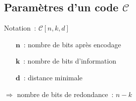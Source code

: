 \documentclass[a4paper,10pt]{leaflet}
\newcommand{\code}[1]{\mathcal{#1}}
\newcommand{\C}{\code{C}}
\begin{document}
\subsection{Paramètres d'un code $\C$}
Notation~: $\C[n,k,d]$

\begin{itemize}
 \item[$\mathbf{n}$~:] nombre de bits après encodage
 \item[$\mathbf{k}$~:] nombre de bits d'information
 \item[$\mathbf{d}$~:] distance minimale
\end{itemize}
$\Rightarrow$ nombre de bits de redondance~: $n-k$
\end{document}
